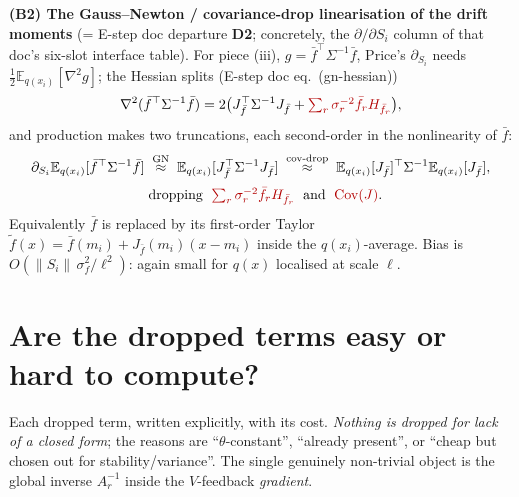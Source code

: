 \documentclass[11pt]{article}
\newcommand{\Eqx}{\mathbb{E}_{q(x_i)}}
\newcommand{\Cov}{\operatorname{Cov}}
\newcommand{\dropped}[1]{\textcolor{red!70!black}{#1}}
\begin{document}
\medskip
\noindent\textbf{(B2) The Gauss--Newton / covariance-drop linearisation of the drift moments}
(= E-step doc departure \textbf{D2}; concretely, the
$\partial/\partial S_i$ column of that doc's six-slot interface table).
For piece (iii), $g=\bar f^\top\Sigma^{-1}\bar f$, Price's $\partial_{S_i}$ needs
$\tfrac12\Eqx[\nabla^2 g]$; the Hessian splits (E-step doc eq.~(gn-hessian))
\begin{equation}
\nabla^2(\bar f^\top\Sigma^{-1}\bar f)=2\big(J_{\bar f}^\top\Sigma^{-1}J_{\bar f}
+\dropped{\textstyle\sum_r\sigma_r^{-2}\bar f_r H_{\bar f_r}}\big),
\end{equation}
and production makes two truncations, each second-order in the nonlinearity of $\bar f$:
\begin{equation}
\begin{aligned}
\partial_{S_i}\Eqx[\bar f^\top\Sigma^{-1}\bar f]
\;&\overset{\text{GN}}{\approx}\;\Eqx[J_{\bar f}^\top\Sigma^{-1}J_{\bar f}]
\;\overset{\text{cov-drop}}{\approx}\;\Eqx[J_{\bar f}]^\top\Sigma^{-1}\Eqx[J_{\bar f}],\\[2pt]
&\text{dropping }\;
\dropped{\textstyle\sum_r\sigma_r^{-2}\bar f_r H_{\bar f_r}}
\;\text{ and }\;\dropped{\Cov(J)}.
\end{aligned}
\end{equation}
Equivalently $\bar f$ is replaced by its first-order Taylor
$\widetilde f(x)=\bar f(m_i)+J_{\bar f}(m_i)(x-m_i)$ inside the $q(x_i)$-average. Bias is
$O(\|S_i\|\,\sigma_f^2/\ell^2)$: again small for $q(x)$ localised at scale $\ell$.

\section{Are the dropped terms easy or hard to compute?}
Each dropped term, written explicitly, with its cost. \emph{Nothing is dropped for
lack of a closed form}; the reasons are ``$\theta$-constant'', ``already present'', or
``cheap but chosen out for stability/variance''. The single genuinely non-trivial
object is the global inverse $A_r^{-1}$ inside the $V$-feedback \emph{gradient}.
\end{document}
